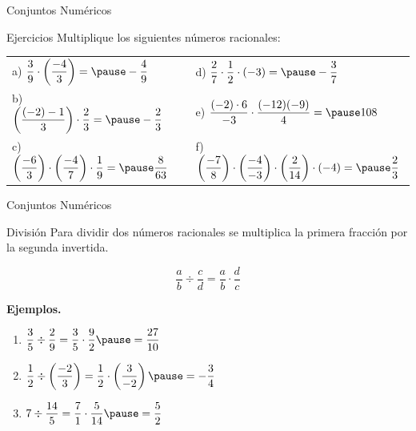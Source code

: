 \documentclass[aspectratio=169,handout,11pt]{beamer}
\begin{document}
	\begin{frame}{Conjuntos Numéricos}
		\begin{block}{Ejercicios}
			Multiplique los siguientes números racionales:
			
			\bigskip
			\begin{tabular}{lll}
				a) $\dfrac{3}{9}\cdot\left(\dfrac{-4}{3}\right)=\pause -\dfrac{4}{9}$ &
				&
				d) $\dfrac{2}{7}\cdot\dfrac{1}{2}\cdot(-3)=\pause -\dfrac{3}{7}$ \\[0.25cm]
				
				b) $\left(\dfrac{(-2)-1}{3}\right)\cdot\dfrac{2}{3}=\pause -\dfrac{2}{3}$ &
				&
				e) $\dfrac{(-2)\cdot6}{-3}\cdot\dfrac{(-12)(-9)}{4}=\pause 108$ \\[0.25cm]
				
				c) $\left(\dfrac{-6}{3}\right)\cdot\left(\dfrac{-4}{7}\right)\cdot\dfrac{1}{9}
				=\pause \dfrac{8}{63}$ &
				&
				f) $\left(\dfrac{-7}{8}\right)\cdot\left(\dfrac{-4}{-3}\right)\cdot\left(\dfrac{2}{14}\right)\cdot(-4)
				=\pause \dfrac{2}{3}$
			\end{tabular}
		\end{block}
	\end{frame}
	
	\begin{frame}{Conjuntos Numéricos}
		\begin{block}{División}
			Para dividir dos números racionales se multiplica la primera fracción por la segunda invertida.
			
			\[
			\frac{a}{b}\div\frac{c}{d}=\frac{a}{b}\cdot\frac{d}{c}
			\]
			
			\textbf{Ejemplos.}
			\begin{enumerate}
				\item $\dfrac{3}{5}\div\dfrac{2}{9}
				=
				\dfrac{3}{5}\cdot\dfrac{9}{2}
				\pause
				=
				\dfrac{27}{10}$
				\pause
				
				\item $\dfrac{1}{2}\div\left(\dfrac{-2}{3}\right)
				=
				\dfrac{1}{2}\cdot\left(\dfrac{3}{-2}\right)
				\pause
				=
				-\dfrac{3}{4}$
				\pause
				
				\item $7\div\dfrac{14}{5}
				=
				\dfrac{7}{1}\cdot\dfrac{5}{14}
				\pause
				=
				\dfrac{5}{2}$
			\end{enumerate}
		\end{block}
	\end{frame}
	
\end{document}
